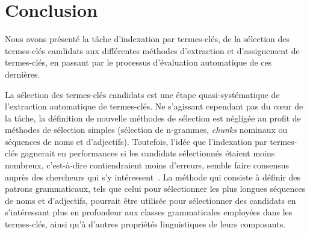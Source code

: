 


  \section{Conclusion}
  \label{sec:main-state_of_the_art-automatic_evaluation_of_keyphrase_annotation-conclusion}
    Nous avons présenté la tâche d'indexation par termes-clés, de la sélection
    des termes-clés candidats aux différentes méthodes d'extraction et
    d'assignement de termes-clés, en passant par le processus d'évaluation
    automatique de ces dernières.

    La sélection des termes-clés candidats est une étape quasi-systématique de
    l'extraction automatique de termes-clés. Ne s'agissant cependant pas du
    c\oe{}ur de la tâche, la définition de nouvelle méthodes de sélection est
    négligée au profit de méthodes de sélection simples (sélection de n-grammes,
    \textit{chunks} nominaux ou séquences de noms et d'adjectifs). Toutefois,
    l'idée que l'indexation par termes-clés gagnerait en performances si les
    candidats sélectionnés étaient moins nombreux, c'est-à-dire contiendraient
    moins d'erreurs, semble faire consensus auprès des chercheurs qui s'y
    intéressent~\cite{huang2006semanticnetworkstructureanalysis,wang2014keyphraseextractionpreprocessing}. La méthode qui
    consiste à définir des patrons grammaticaux, tels que celui pour
    sélectionner les plus longues séquences de noms et d'adjectifs, pourrait
    être utilisée pour sélectionner des candidats en s'intéressant plus en
    profondeur aux classes grammaticales employées dans les termes-clés, ainsi
    qu'à d'autres propriétés linguistiques de leurs composants.

